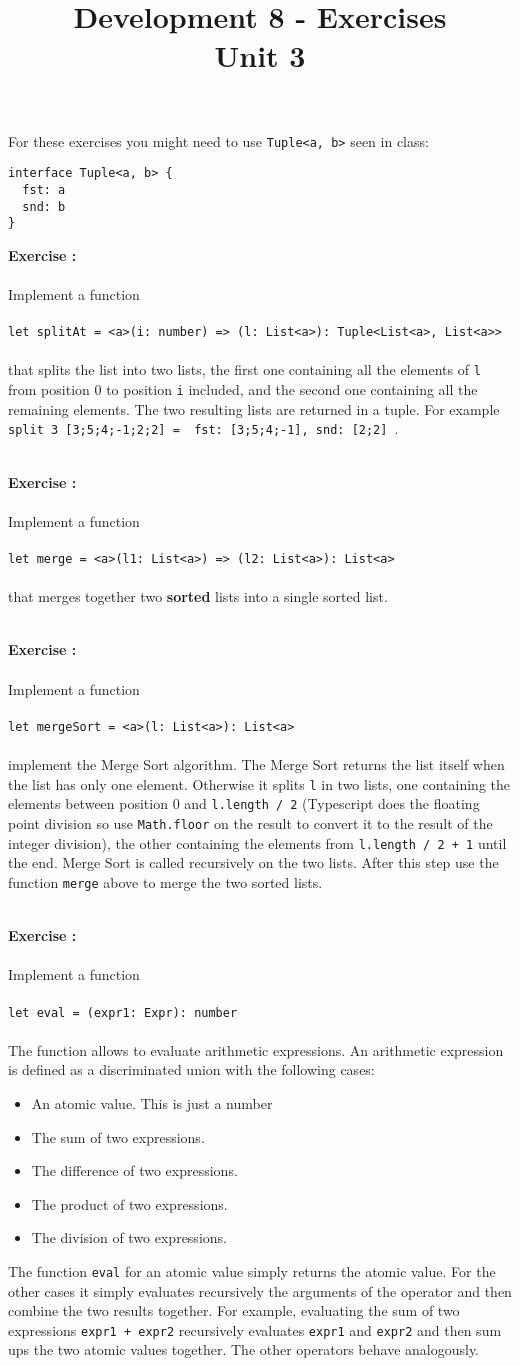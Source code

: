 \documentclass[]{article}
\title{Development 8 - Exercises\\Unit 3}
\author{}
\date{}
\newcounter{ExerciseCount}
\newcommand{\functionEx}[3]{
  Implement a function\\\\
   \texttt{let #1 = #2}\\\\ #3
}
\newcommand{\exercise}[1]{\noindent \textbf{Exercise \theExerciseCount:}\\\\ #1 \addtocounter{ExerciseCount}{1}
}
\begin{document}
\maketitle

\noindent
For these exercises you might need to use \texttt{Tuple<a, b>} seen in class:

\begin{lstlisting}
interface Tuple<a, b> {
  fst: a
  snd: b
}
\end{lstlisting}

\exercise{
  \functionEx{splitAt}{<a>(i: number) => (l: List<a>): Tuple<List<a>, List<a>>}{
    that splits the list into two lists, the first one containing all the elements of \texttt{l} from position 0 to position \texttt{i} included, and the second one containing all the remaining elements. The two resulting lists are returned in a tuple. For example \texttt{split 3 [3;5;4;-1;2;2] = { fst: [3;5;4;-1], snd: [2;2] }}.
}}\\

\exercise{
  \functionEx{merge}{<a>(l1: List<a>) => (l2: List<a>): List<a>}{
   that merges together two \textbf{sorted} lists into a single sorted list.
}}\\

\exercise{
  \functionEx{mergeSort}{<a>(l: List<a>): List<a>}{
  implement the Merge Sort algorithm. The Merge Sort returns the list itself when the list has only one element. Otherwise it splits \texttt{l} in two lists, one containing the elements between position 0 and \texttt{l.length / 2} (Typescript does the floating point division so use \texttt{Math.floor} on the result to convert it to the result of the integer division), the other containing the elements from \texttt{l.length / 2 + 1} until the end. Merge Sort is called recursively on the two lists. After this step use the function \texttt{merge} above to merge the two sorted lists.
}}\\

\exercise{
  \functionEx{eval}{(expr1: Expr): number}{
  The function allows to evaluate arithmetic expressions. An arithmetic expression is defined as a discriminated union with the following cases:
  
  \begin{itemize}[noitemsep]
  \item An atomic value. This is just a number
  \item The sum of two expressions.
  \item The difference of two expressions.
  \item The product of two expressions.
  \item The division of two expressions.
  \end{itemize}
  
 The function \texttt{eval} for an atomic value simply returns the atomic value. For the other cases it simply evaluates recursively the arguments of the operator and then combine the two results together. For example, evaluating the sum of two expressions \texttt{expr1 + expr2} recursively evaluates \texttt{expr1} and \texttt{expr2} and then sum ups the two atomic values together. The other operators behave analogously.
}}\\
\end{document}

